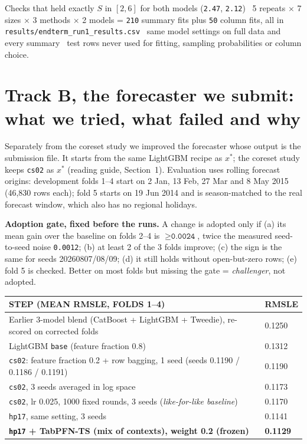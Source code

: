 \documentclass[10pt,a4paper,twocolumn]{article}
\newcommand{\n}[1]{\texttt{#1}}
\newcommand{\code}[1]{\texttt{#1}}
\newcommand{\thh}[1]{{\sffamily\scriptsize\bfseries\color{greytext}\MakeUppercase{#1}}}
\begin{document}
\begin{stamp}{Checks that held exactly}
$S$ in $[2,6]$ for both models (\n{2.47}, \n{2.12}) \textbullet\ 5 repeats $\times$ 7 sizes $\times$ 3 methods $\times$ 2 models
= \n{210} summary fits plus \n{50} column fits, all in \code{results/endterm\_run1\_results.csv} \textbullet\ same model settings on
full data and every summary \textbullet\ test rows never used for fitting, sampling probabilities or column choice.
\end{stamp}

\section{Track B, the forecaster we submit: what we tried, what failed and why}

Separately from the coreset study we improved the forecaster whose output is the submission file. It starts from the same
LightGBM recipe as $x^\ast$; the coreset study keeps \code{cs02} as $x^\ast$ (reading guide, Section~1). Evaluation uses
rolling forecast origins: development folds 1--4 start on 2 Jan, 13 Feb, 27 Mar and 8 May 2015 (46{,}830 rows each); fold 5
starts on 19 Jun 2014 and is season-matched to the real forecast window, which also has no regional holidays.

\begin{eqbox}\small\textbf{Adoption gate, fixed before the runs.} A change is adopted only if (a) its mean gain over
the baseline on folds 2--4 is $\ge\n{0.0024}$, twice the measured seed-to-seed noise \n{0.0012}; (b) at least 2 of the 3
folds improve; (c) the sign is the same for seeds 20260807/08/09; (d) it still holds without open-but-zero rows; (e) fold 5
is checked. Better on most folds but missing the gate = \emph{challenger}, not adopted.
\end{eqbox}

{\small
\begin{tabularx}{\linewidth}{@{}Y M@{}}
\toprule
\thh{Step (mean RMSLE, folds 1--4)} & \thh{RMSLE} \\
\midrule
Earlier 3-model blend (CatBoost + LightGBM + Tweedie), re-scored on corrected folds & 0.1250 \\
LightGBM \code{base} (feature fraction 0.8) & 0.1312 \\
\code{cs02}: feature fraction 0.2 + row bagging, 1 seed (seeds 0.1190 / 0.1186 / 0.1191) & 0.1190 \\
\code{cs02}, 3 seeds averaged in log space & 0.1173 \\
\code{cs02}, lr 0.025, 1000 fixed rounds, 3 seeds (\emph{like-for-like baseline}) & 0.1170 \\
\code{hp17}, same setting, 3 seeds & 0.1141 \\
\textbf{\code{hp17} + TabPFN-TS (mix of contexts), weight 0.2 (frozen)} & \textcolor{ultra}{\textbf{0.1129}} \\
\bottomrule
\end{tabularx}}
\end{document}
